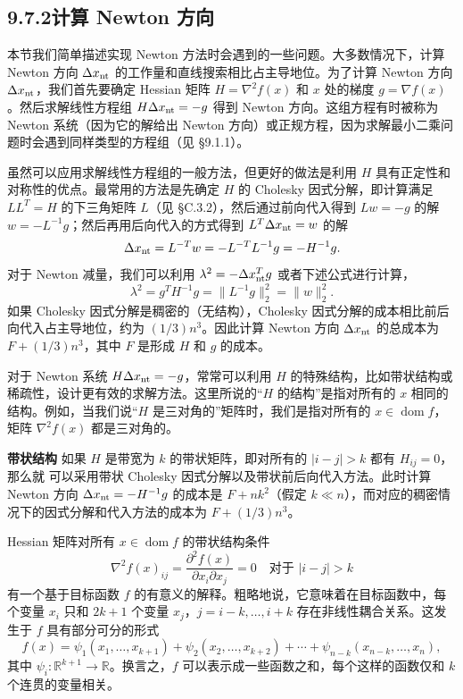 \documentclass[UTF8, 12pt, fontset=fandol, oneside]{ctexart}
\begin{document}
\subsection*{9.7.2\quad 计算 Newton 方向}

本节我们简单描述实现 Newton 方法时会遇到的一些问题。大多数情况下，计算 Newton 方向 $\Delta x_{\rm nt}$ 的工作量和直线搜索相比占主导地位。为了计算 Newton 方向 $\Delta x_{\rm nt}$，我们首先要确定 Hessian 矩阵 $H=\nabla^2 f(x)$ 和 $x$ 处的梯度 $g=\nabla f(x)$。然后求解线性方程组 $H\Delta x_{\rm nt}=-g$ 得到 Newton 方向。这组方程有时被称为 Newton 系统（因为它的解给出 Newton 方向）或正规方程，因为求解最小二乘问题时会遇到同样类型的方程组（见 \S9.1.1）。

虽然可以应用求解线性方程组的一般方法，但更好的做法是利用 $H$ 具有正定性和对称性的优点。最常用的方法是先确定 $H$ 的 Cholesky 因式分解，即计算满足 $LL^T=H$ 的下三角矩阵 $L$（见 \S C.3.2），然后通过前向代入得到 $Lw=-g$ 的解 $w=-L^{-1}g$；然后再用后向代入的方式得到 $L^T\Delta x_{\rm nt}=w$ 的解
\[
\Delta x_{\rm nt}=L^{-T}w=-L^{-T}L^{-1}g=-H^{-1}g.
\]
对于 Newton 减量，我们可以利用 $\lambda^2=-\Delta x_{\rm nt}^Tg$ 或者下述公式进行计算，
\[
\lambda^2=g^TH^{-1}g=\|L^{-1}g\|_2^2=\|w\|_2^2.
\]
如果 Cholesky 因式分解是稠密的（无结构），Cholesky 因式分解的成本相比前后向代入占主导地位，约为 $(1/3)n^3$。因此计算 Newton 方向 $\Delta x_{\rm nt}$ 的总成本为 $F+(1/3)n^3$，其中 $F$ 是形成 $H$ 和 $g$ 的成本。

对于 Newton 系统 $H\Delta x_{\rm nt}=-g$，常常可以利用 $H$ 的特殊结构，比如带状结构或稀疏性，设计更有效的求解方法。这里所说的“$H$ 的结构”是指对所有的 $x$ 相同的结构。例如，当我们说“$H$ 是三对角的”矩阵时，我们是指对所有的 $x\in\operatorname{dom} f$，矩阵 $\nabla^2 f(x)$ 都是三对角的。

\noindent\textbf{带状结构}\quad
如果 $H$ 是带宽为 $k$ 的带状矩阵，即对所有的 $|i-j|>k$ 都有 $H_{ij}=0$，那么就
可以采用带状 Cholesky 因式分解以及带状前后向代入方法。此时计算 Newton 方向 $\Delta x_{\rm nt}=-H^{-1}g$ 的成本是 $F+nk^2$（假定 $k\ll n$），而对应的稠密情况下的因式分解和代入方法的成本为 $F+(1/3)n^3$。

Hessian 矩阵对所有 $x\in\operatorname{dom} f$ 的带状结构条件
\[
\nabla^2 f(x)_{ij}=\frac{\partial^2 f(x)}{\partial x_i\partial x_j}=0\quad \text{对于 } |i-j|>k
\]
有一个基于目标函数 $f$ 的有意义的解释。粗略地说，它意味着在目标函数中，每个变量 $x_i$ 只和 $2k+1$ 个变量 $x_j$，$j=i-k,\ldots,i+k$ 存在非线性耦合关系。这发生于 $f$ 具有部分可分的形式
\[
f(x)=\psi_1(x_1,\ldots,x_{k+1})+\psi_2(x_2,\ldots,x_{k+2})+\cdots+\psi_{n-k}(x_{n-k},\ldots,x_n),
\]
其中 $\psi_i:\mathbb{R}^{k+1}\to\mathbb{R}$。换言之，$f$ 可以表示成一些函数之和，每个这样的函数仅和 $k$ 个连贯的变量相关。
\end{document}
